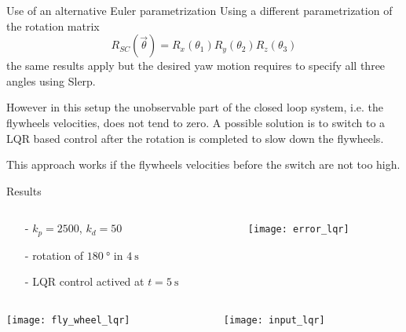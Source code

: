 \begin{frame}{Use of an alternative Euler parametrization}
  Using a different parametrization of the rotation matrix
  \[
  R_{SC}(\vec{\theta}) = R_x(\theta_1)R_y(\theta_2)R_z(\theta_3)
  \]
  the same results apply but the desired yaw motion requires to specify
  all three angles using Slerp.
  \par
  However in this setup the unobservable part of the closed loop system, i.e.
  the flywheels velocities, does not tend to zero. A possible solution is to switch
  to a LQR based control after the rotation is completed to slow down the flywheels.
  \par
  This approach works if the flywheels velocities before the switch are not too high.
\end{frame}

\begin{frame}{Results}
  \vskip0.1in
  \begin{columns}
    \begin{column}{0.45\textwidth}
      \begin{itemize}
      \item[-]$k_p = 2500$, $k_d = 50$
      \item[-]rotation of $\SI{180}{\degree}$ in $\SI{4}{\second}$
      \item[-]LQR control actived at $t = \SI{5}{\second}$ 
      \end{itemize}
    \end{column}
    \begin{column}{0.45\textwidth}
      \texttt{[image: error\_lqr]}
    \end{column}
  \end{columns}
  \begin{columns}
    \begin{column}{0.45\textwidth}
      \texttt{[image: fly\_wheel\_lqr]}
    \end{column}
    \begin{column}{0.45\textwidth}
      \texttt{[image: input\_lqr]}
    \end{column}
  \end{columns}
\end{frame}



